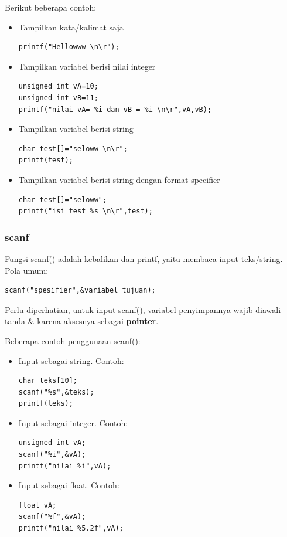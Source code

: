 \documentclass[12pt,]{article}
\begin{document}
	Berikut beberapa contoh:
	\begin{itemize}
		\item Tampilkan kata/kalimat saja
		\begin{verbatim}
printf("Hellowww \n\r");
		\end{verbatim}
		
		\item Tampilkan variabel berisi nilai integer
		\begin{verbatim}
unsigned int vA=10;
unsigned int vB=11;
printf("nilai vA= %i dan vB = %i \n\r",vA,vB);
		\end{verbatim}
		
		\item Tampilkan variabel berisi string
		\begin{verbatim}
char test[]="seloww \n\r";
printf(test);
		\end{verbatim}
		
		\item Tampilkan variabel berisi string dengan format specifier
		\begin{verbatim}
char test[]="seloww";
printf("isi test %s \n\r",test);
		\end{verbatim}
	\end{itemize}

	\subsubsection{scanf}
	
	Fungsi scanf() adalah kebalikan dan printf, yaitu membaca input teks/string.
	Pola umum:
	\begin{verbatim}
scanf("spesifier",&variabel_tujuan);
	\end{verbatim}
	Perlu diperhatian, untuk input scanf(), variabel penyimpannya wajib diawali tanda \& karena aksesnya sebagai \textbf{pointer}.
	
	Beberapa contoh penggunaan scanf():
	\begin{itemize}
		\item Input sebagai string.
		Contoh:
		\begin{verbatim}
char teks[10];
scanf("%s",&teks);
printf(teks);
		\end{verbatim}
		
		\item Input sebagai integer.
		Contoh:
		\begin{verbatim}
unsigned int vA;
scanf("%i",&vA);
printf("nilai %i",vA);
		\end{verbatim}
		
		\item Input sebagai float.
		Contoh:
		\begin{verbatim}
float vA;
scanf("%f",&vA);
printf("nilai %5.2f",vA);
		\end{verbatim}
		
	\end{itemize}
\end{document}
